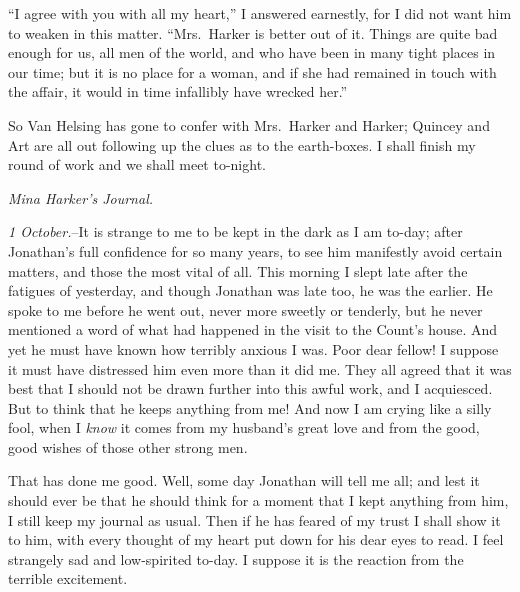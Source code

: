 \documentclass[12pt,openright]{book}
\begin{document}
“I agree with you with all my heart,” I answered earnestly, for I did not want him to weaken in this matter. “Mrs. Harker is better out of it. Things are quite bad enough for us, all men of the world, and who have been in many tight places in our time; but it is no place for a woman, and if she had remained in touch with the affair, it would in time infallibly have wrecked her.”

So Van Helsing has gone to confer with Mrs. Harker and Harker; Quincey and Art are all out following up the clues as to the earth-boxes. I shall finish my round of work and we shall meet to-night.

\textit{Mina Harker’s Journal.}

\textit{1 October.}–It is strange to me to be kept in the dark as I am to-day; after Jonathan’s full confidence for so many years, to see him manifestly avoid certain matters, and those the most vital of all. This morning I slept late after the fatigues of yesterday, and though Jonathan was late too, he was the earlier. He spoke to me before he went out, never more sweetly or tenderly, but he never mentioned a word of what had happened in the visit to the Count’s house. And yet he must have known how terribly anxious I was. Poor dear fellow! I suppose it must have distressed him even more than it did me. They all agreed that it was best that I should not be drawn further into this awful work, and I acquiesced. But to think that he keeps anything from me! And now I am crying like a silly fool, when I \textit{know} it comes from my husband’s great love and from the good, good wishes of those other strong men.

That has done me good. Well, some day Jonathan will tell me all; and lest it should ever be that he should think for a moment that I kept anything from him, I still keep my journal as usual. Then if he has feared of my trust I shall show it to him, with every thought of my heart put down for his dear eyes to read. I feel strangely sad and low-spirited to-day. I suppose it is the reaction from the terrible excitement.
\end{document}
